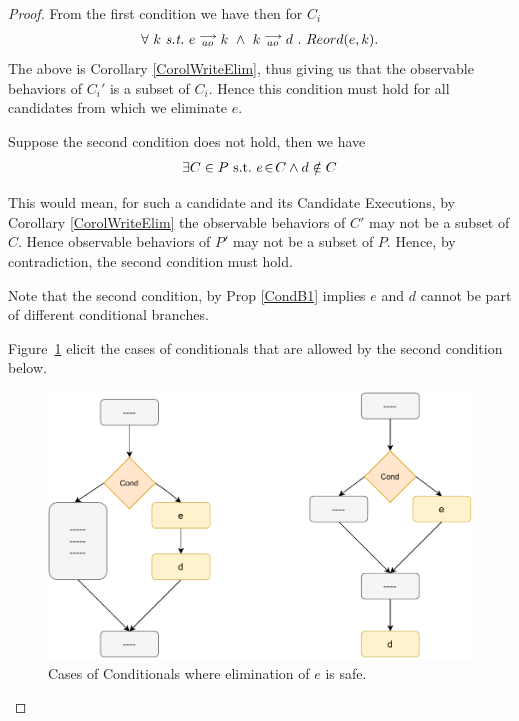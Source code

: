     \begin{proof}
    
        From the first condition we have then for $C_i$
        \begin{align*}
            \forall \ k \ \textit{s.t.} \ 
            \reln{e}{ao}{k} \ \wedge \ \reln{k}{ao}{d} \ . \ 
            Reord(e,k).
        \end{align*}
        The above is Corollary \ref{CorolWriteElim}, thus giving us that the observable behaviors of $C_i'$ is a subset of $C_i$. Hence this condition must hold for all candidates from which we eliminate $e$. 
    
        Suppose the second condition does not hold, then we have 
        \begin{align*}
            \exists C \in P \ \text{s.t.} \  e\!\in\!C \wedge d \notin C
        \end{align*}
    
        This would mean, for such a candidate and its Candidate Executions, by Corollary \ref{CorolWriteElim} the observable behaviors of $C'$ may not be a subset of $C$. 
        Hence observable behaviors of $P'$ may not be a subset of $P$.
        Hence, by contradiction, the second condition must hold. 
    
        Note that the second condition, by Prop \ref{CondB1} implies $e$ and $d$ cannot be part of different conditional branches.
        
        Figure~\ref{elim:cond} elicit the cases of conditionals that are allowed by the second condition below.
        \begin{figure}[H]
            \centering
            \includegraphics[scale=0.7]{6.Elimination/2.ValidEliminationProgram/Conditionals/ConditionalsCases.pdf}
            \caption{Cases of Conditionals where elimination of $e$ is safe.}
            \label{elim:cond}
        \end{figure}
    
    \end{proof}
    
